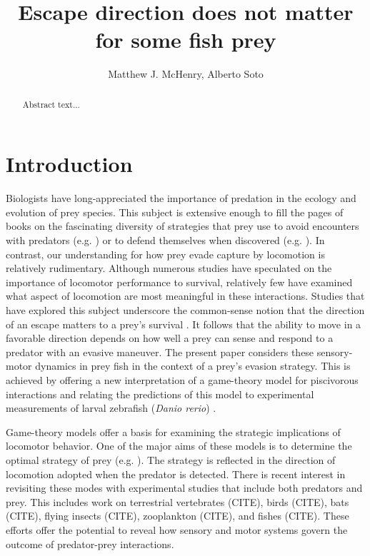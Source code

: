 \documentclass[12pt]{article}
\title{Escape direction does not matter for some fish prey}
\author{Matthew J. McHenry, Alberto Soto}
\begin{document}

\maketitle

\pagebreak


\begin{abstract}

Abstract text...

\end{abstract}

\pagebreak


\section{Introduction}


Biologists have long-appreciated the importance of predation in the ecology and evolution of prey species. This subject is extensive enough to fill the pages of books on the fascinating diversity of strategies that prey use to avoid encounters with predators (e.g. \cite{Ruxton:2004vb}) or to defend themselves when discovered (e.g. \cite{Emlen:2014wb, Evans:1990va}). In contrast, our understanding for how prey evade capture by locomotion is relatively rudimentary. Although numerous studies have speculated on the importance of locomotor performance to survival, relatively few have examined what aspect of locomotion are most meaningful in these interactions. Studies that have explored this subject underscore the common-sense notion that the direction of an escape matters to a prey's survival \citep{Domenici:2011tv}. It follows that the ability to move in a favorable direction depends on how well a prey can sense and respond to a predator with an evasive maneuver. The present paper considers these sensory-motor dynamics in prey fish in the context of a prey's evasion strategy. This is achieved by offering a new interpretation of a game-theory model for piscivorous interactions \citep{Weihs:1984tb} and relating the predictions of this model to experimental measurements of larval zebrafish (\textit{Danio rerio}) \citep{Stewart:2014cm}.

Game-theory models offer a basis for examining the strategic implications of locomotor behavior. One of the major aims of these models is to determine the optimal strategy of prey (e.g. \cite{Howland:1974}). The strategy is reflected in the direction of locomotion adopted when the predator is detected. There is recent interest in revisiting these modes with experimental studies that include both predators and prey. This includes work on terrestrial vertebrates (CITE), birds (CITE), bats (CITE), flying insects (CITE), zooplankton (CITE), and fishes (CITE). These efforts offer the potential to reveal how sensory and motor systems govern the outcome of predator-prey interactions. 
\end{document}
